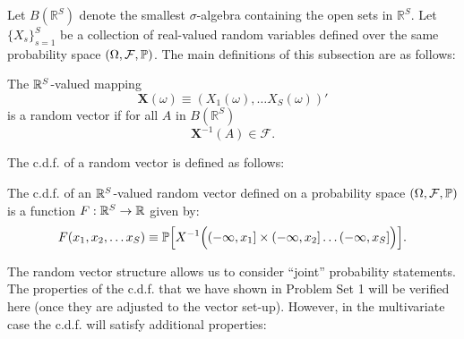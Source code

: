 \documentclass[11pt]{article} %
\begin{document}
\begin{enumerate}
%

\end{enumerate}

\noindent Let $B(\mathbb{R}^S)$ denote the smallest $\sigma$-algebra containing the open sets in $\mathbb{R}^{S}$. Let $\{X_{s}\}_{s=1}^{S}$ be a collection of real-valued random variables defined over the same probability space $(\Omega, \mathcal{F}, \mathbb{P})$.  The main definitions of this subsection are as follows:

\begin{definition} 
The $\mathbb{R}^{S}$-valued mapping 
$$\mathbf{X}(\omega) \equiv (X_1(\omega), \ldots X_S(\omega))' $$
\noindent is a random vector if for all $A$ in $B(\mathbb{R}^S)$ 
$$\mathbf{X}^{-1}(A) \in \mathcal{F}.$$
\end{definition}

\noindent The c.d.f. of a random vector is defined as follows:
 
\begin{definition} The c.d.f. of an $\mathbb{R}^{S}$-valued random vector defined on a probability space $(\Omega, \mathcal{F}, \mathbb{P})$ is a function $F:\mathbb{R}^S \rightarrow \mathbb{R}$ given by:
$$F(x_1, x_2, \ldots x_S) \equiv \mathbb{P} \Big[ X^{-1} \Big( (-\infty, x_1] \times (-\infty, x_2] \ldots (-\infty, x_S] \Big) \Big].$$
\end{definition}

The random vector structure allows us to consider ``joint'' probability statements. The properties of the c.d.f. that we have shown in Problem Set 1 will be verified here (once they are adjusted to the vector set-up). However, in the multivariate case the c.d.f. will satisfy additional properties:\\
\end{document}
